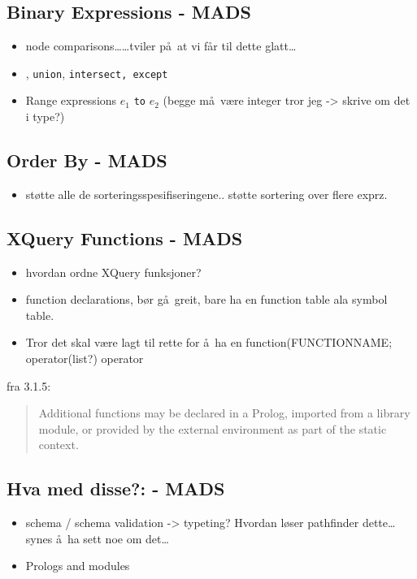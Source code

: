 \subsection{Binary Expressions - {MADS}}
\begin{itemize}
  		\item node comparisons\ldots\ldots tviler p\aa~at vi f\aa r til dette glatt\ldots

  		\item \textbar, \texttt{union}, \texttt{intersect, except}
  		\item Range expressions $e_1$ \texttt{to} $e_2$ (begge m\aa~v\ae re integer tror jeg -> skrive om det i type?) 
\end{itemize}


\subsection{Order By - {MADS}}
\label{sect:disc:orderby}
\begin{itemize}
  \item st\o tte alle de sorteringsspesifiseringene.. st\o tte sortering over flere exprz.
\end{itemize}
	
		
\subsection{XQuery Functions - {MADS}}
\label{sect:disc:functions}
\begin{itemize}
  \item hvordan ordne XQuery funksjoner?
  \item function declarations, b\o r g\aa~greit, bare ha en function table ala symbol table.
  \item Tror det skal v\ae re lagt til rette for \aa~ha en \textsf{function(FUNCTIONNAME; operator(list?)} operator
  \end{itemize}
  
fra 3.1.5:
\begin{quote}
  Additional functions may be declared in a Prolog, imported from a library module, or provided by the external
  environment as part of the static context.
  \end{quote}


\subsection{Hva med disse?: - {MADS}}

  	\begin{itemize}
  		\item schema / schema validation -> typeting? Hvordan l\o ser pathfinder dette\ldots synes \aa~ha sett noe om
  		det\ldots
  		\item Prologs and modules
  		\end{itemize}

